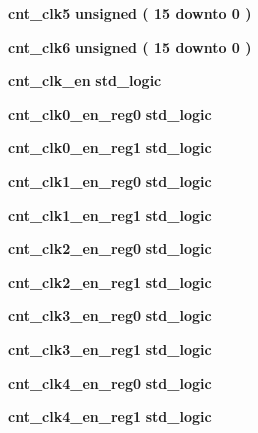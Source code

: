\begin{DoxyCompactItemize}
\item 
{\bf cnt\+\_\+clk5} {\bfseries \textcolor{comment}{unsigned}\textcolor{vhdlchar}{ }\textcolor{vhdlchar}{(}\textcolor{vhdlchar}{ }\textcolor{vhdlchar}{ } \textcolor{vhdldigit}{15} \textcolor{vhdlchar}{ }\textcolor{keywordflow}{downto}\textcolor{vhdlchar}{ }\textcolor{vhdlchar}{ } \textcolor{vhdldigit}{0} \textcolor{vhdlchar}{ }\textcolor{vhdlchar}{)}\textcolor{vhdlchar}{ }} 
\item 
{\bf cnt\+\_\+clk6} {\bfseries \textcolor{comment}{unsigned}\textcolor{vhdlchar}{ }\textcolor{vhdlchar}{(}\textcolor{vhdlchar}{ }\textcolor{vhdlchar}{ } \textcolor{vhdldigit}{15} \textcolor{vhdlchar}{ }\textcolor{keywordflow}{downto}\textcolor{vhdlchar}{ }\textcolor{vhdlchar}{ } \textcolor{vhdldigit}{0} \textcolor{vhdlchar}{ }\textcolor{vhdlchar}{)}\textcolor{vhdlchar}{ }} 
\item 
{\bf cnt\+\_\+clk\+\_\+en} {\bfseries \textcolor{comment}{std\+\_\+logic}\textcolor{vhdlchar}{ }} 
\item 
{\bf cnt\+\_\+clk0\+\_\+en\+\_\+reg0} {\bfseries \textcolor{comment}{std\+\_\+logic}\textcolor{vhdlchar}{ }} 
\item 
{\bf cnt\+\_\+clk0\+\_\+en\+\_\+reg1} {\bfseries \textcolor{comment}{std\+\_\+logic}\textcolor{vhdlchar}{ }} 
\item 
{\bf cnt\+\_\+clk1\+\_\+en\+\_\+reg0} {\bfseries \textcolor{comment}{std\+\_\+logic}\textcolor{vhdlchar}{ }} 
\item 
{\bf cnt\+\_\+clk1\+\_\+en\+\_\+reg1} {\bfseries \textcolor{comment}{std\+\_\+logic}\textcolor{vhdlchar}{ }} 
\item 
{\bf cnt\+\_\+clk2\+\_\+en\+\_\+reg0} {\bfseries \textcolor{comment}{std\+\_\+logic}\textcolor{vhdlchar}{ }} 
\item 
{\bf cnt\+\_\+clk2\+\_\+en\+\_\+reg1} {\bfseries \textcolor{comment}{std\+\_\+logic}\textcolor{vhdlchar}{ }} 
\item 
{\bf cnt\+\_\+clk3\+\_\+en\+\_\+reg0} {\bfseries \textcolor{comment}{std\+\_\+logic}\textcolor{vhdlchar}{ }} 
\item 
{\bf cnt\+\_\+clk3\+\_\+en\+\_\+reg1} {\bfseries \textcolor{comment}{std\+\_\+logic}\textcolor{vhdlchar}{ }} 
\item 
{\bf cnt\+\_\+clk4\+\_\+en\+\_\+reg0} {\bfseries \textcolor{comment}{std\+\_\+logic}\textcolor{vhdlchar}{ }} 
\item 
{\bf cnt\+\_\+clk4\+\_\+en\+\_\+reg1} {\bfseries \textcolor{comment}{std\+\_\+logic}\textcolor{vhdlchar}{ }} 
\item 

\end{DoxyCompactItemize}
